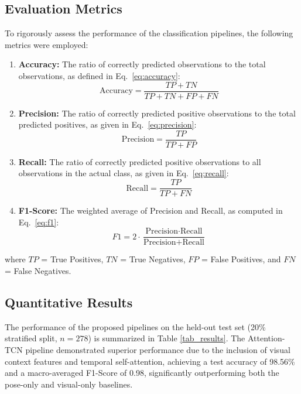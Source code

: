 \documentclass[pdflatex,sn-mathphys-num]{sn-jnl}
\theoremstyle{thmstyleone}%
\theoremstyle{thmstyletwo}%
\theoremstyle{thmstylethree}%
\begin{document}
\subsection{Evaluation Metrics}
To rigorously assess the performance of the classification pipelines, the following metrics were employed:

\begin{enumerate}
    \item \textbf{Accuracy:} The ratio of correctly predicted observations to the total observations, as defined in Eq.~\eqref{eq:accuracy}:
    \begin{equation}
        \text{Accuracy} = \frac{TP + TN}{TP + TN + FP + FN}
        \label{eq:accuracy}
    \end{equation}
    
    \item \textbf{Precision:} The ratio of correctly predicted positive observations to the total predicted positives, as given in Eq.~\eqref{eq:precision}:
    \begin{equation}
        \text{Precision} = \frac{TP}{TP + FP}
        \label{eq:precision}
    \end{equation}
    
    \item \textbf{Recall:} The ratio of correctly predicted positive observations to all observations in the actual class, as given in Eq.~\eqref{eq:recall}:
    \begin{equation}
        \text{Recall} = \frac{TP}{TP + FN}
        \label{eq:recall}
    \end{equation}
    
    \item \textbf{F1-Score:} The weighted average of Precision and Recall, as computed in Eq.~\eqref{eq:f1}:
    \begin{equation}
        F1 = 2 \cdot \frac{\text{Precision} \cdot \text{Recall}}{\text{Precision} + \text{Recall}}
        \label{eq:f1}
    \end{equation}
\end{enumerate}
\noindent where $TP$ = True Positives, $TN$ = True Negatives, $FP$ = False Positives, and $FN$ = False Negatives.

\subsection{Quantitative Results}
The performance of the proposed pipelines on the held-out test set (20\% stratified split, $n=278$) is summarized in Table \ref{tab_results}. The Attention-TCN pipeline demonstrated superior performance due to the inclusion of visual context features and temporal self-attention, achieving a test accuracy of 98.56\% and a macro-averaged F1-Score of 0.98, significantly outperforming both the pose-only and visual-only baselines.
\end{document}
